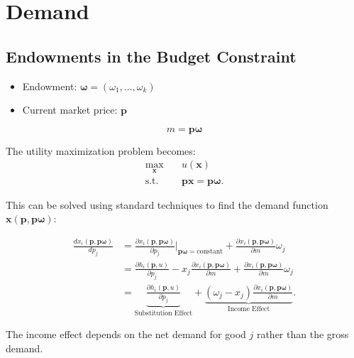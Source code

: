 \chapter{Demand}

\section{Endowments in the Budget Constraint}

\begin{itemize}
    \item Endowment: $\mathbf{\omega} = (\omega_1, \dots, \omega_k)$
    \item Current market price: $\mathbf{p}$
\end{itemize}

\[
m = \mathbf{p \omega}
\]

The utility maximization problem becomes:
\[
\begin{aligned}
\underset{\mathbf{x}}{\max} &\quad u(\mathbf{x}) \\
\text{s.t.} &\quad \mathbf{p x} = \mathbf{p \omega}.
\end{aligned}
\]

This can be solved using standard techniques to find the demand function $\mathbf{x(p, p \omega)}$:

\[
\begin{aligned}
\frac{dx_i(\mathbf{p, p\omega})}{d p_j} &=
\frac{\partial x_i(\mathbf{p, p\omega})}{\partial p_j}|_{\mathbf{p\omega}=\text{constant}} +
\frac{\partial x_i(\mathbf{p, p\omega})}{\partial m} \omega_j \\
&= \frac{\partial h_i(\mathbf{p}, u)}{\partial p_j} - x_j \frac{\partial x_i(\mathbf{p, p\omega})}{\partial m} + \frac{\partial x_i(\mathbf{p, p\omega})}{\partial m} \omega_j \\
&= \underbrace{\frac{\partial h_i(\mathbf{p}, u)}{\partial p_j}}_{\text{Substitution Effect}} + \underbrace{(\omega_j - x_j) \frac{\partial x_i(\mathbf{p, p\omega})}{\partial m}}_{\text{Income Effect}}.
\end{aligned}
\]

The income effect depends on the net demand for good $j$ rather than the gross demand.

